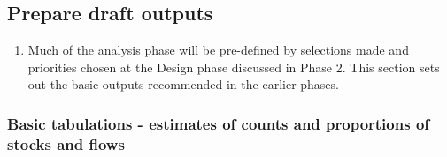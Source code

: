 \documentclass[
]{article}
\providecommand{\tightlist}{%
  \setlength{\itemsep}{0pt}\setlength{\parskip}{0pt}}
\begin{document}
\hypertarget{prepare-draft-outputs}{%
\subsection{Prepare draft outputs}\label{prepare-draft-outputs}}

\begin{enumerate}
\def\labelenumi{\arabic{enumi}.}
\setcounter{enumi}{400}
\tightlist
\item
  Much of the analysis phase will be pre-defined by selections made
  and priorities chosen at the Design phase discussed in Phase 2. This
  section sets out the basic outputs recommended in the earlier
  phases.
\end{enumerate}

\hypertarget{basic-tabulations---estimates-of-counts-and-proportions-of-stocks-and-flows}{%
\subsubsection{Basic tabulations - estimates of counts and proportions of stocks and flows}\label{basic-tabulations---estimates-of-counts-and-proportions-of-stocks-and-flows}}
\end{document}

